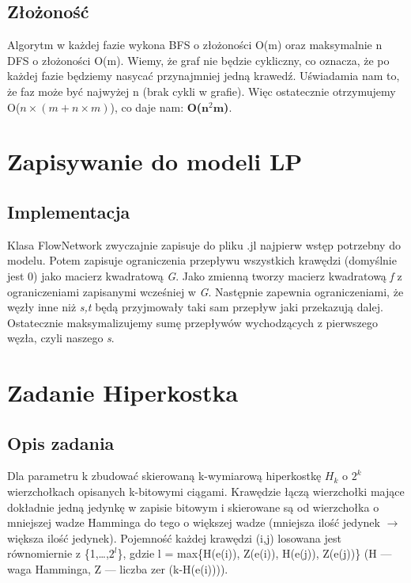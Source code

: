 \documentclass{article}
\begin{document}
\subsection{Złożoność}
Algorytm w każdej fazie wykona BFS o złożoności O(m) oraz maksymalnie n DFS o złożoności O(m). Wiemy, że graf nie będzie cykliczny, co oznacza, że po każdej fazie będziemy nasycać przynajmniej jedną krawedź. Uświadamia nam to, że faz może być najwyżej n (brak cykli w grafie). Więc ostatecznie otrzymujemy O($n \times (m + n \times m)$), co daje nam: \textbf{O($\textbf{n}^{2}\textbf{m}$)}.

\section{Zapisywanie do modeli LP}
\subsection{Implementacja}
Klasa FlowNetwork zwyczajnie zapisuje do pliku .jl najpierw wstęp potrzebny do modelu. Potem zapisuje ograniczenia przepływu wszystkich krawędzi (domyślnie jest 0) jako macierz kwadratową \textit{G}. Jako zmienną tworzy macierz kwadratową \textit{f} z ograniczeniami zapisanymi wcześniej w \textit{G}. Następnie zapewnia ograniczeniami, że węzły inne niż \textit{{s,t}} będą przyjmowały taki sam przepływ jaki przekazują dalej. Ostatecznie maksymalizujemy sumę przepływów wychodzących z pierwszego węzła, czyli naszego \textit{s}.

\section{Zadanie Hiperkostka} 
\subsection{Opis zadania}
Dla parametru k zbudować skierowaną k-wymiarową hiperkostkę $H_{k}$ o $2^{k}$ wierzchołkach opisanych k-bitowymi ciągami.
Krawędzie łączą wierzchołki mające dokładnie jedną jedynkę w zapisie bitowym i skierowane są od wierzchołka o mniejszej wadze Hamminga do tego o większej wadze (mniejsza ilość jedynek $\rightarrow$ większa ilość jedynek).
Pojemność każdej krawędzi (i,j) losowana jest równomiernie z \{1,\dots,$2^{l}$\}, gdzie l = max\{H(e(i)), Z(e(i)), H(e(j)), Z(e(j))\} (H — waga Hamminga, Z — liczba zer (k-H(e(i)))).
\end{document}
